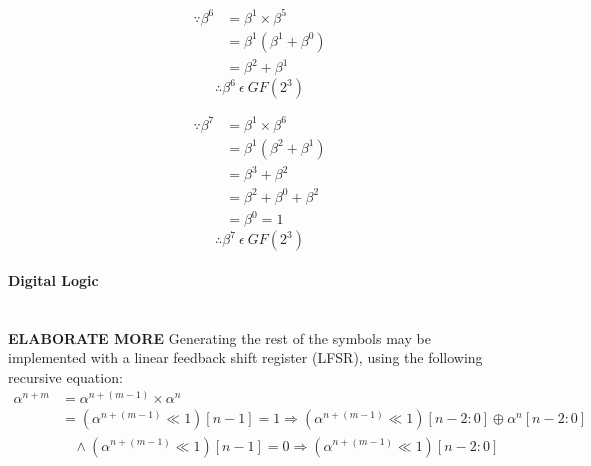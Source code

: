         \begin{minipage}[t]{0.5\textwidth}
            \begin{equation*}
                \begin{split}
                    \because \beta^{6} & = \beta^{1} \times \beta^{5} \\
                    & = \beta^{1} (\beta^{1}+\beta^{0}) \\
                    & = \beta^{2}+\beta^{1}
                \end{split}
            \end{equation*}
            \[ \therefore \beta^{6} \ \epsilon \ GF(2^{3}) \]
        \end{minipage}
        \begin{minipage}[t]{0.5\textwidth}
            \begin{equation*}
                \begin{split}
                    \because \beta^{7} & = \beta^{1} \times \beta^{6} \\
                    & = \beta^{1} (\beta^{2}+\beta^{1}) \\
                    & = \beta^{3}+\beta^{2} \\
                    & = \beta^{2}+\beta^{0}+\beta^{2} \\
                    & = \beta^{0} = 1
                \end{split}
            \end{equation*}
            \[ \therefore \beta^{7} \ \epsilon \ GF(2^{3}) \]
        \end{minipage}
        \newpage

        \paragraph{Digital Logic} \leavevmode \\ \textbf{ELABORATE MORE}
        Generating the rest of the symbols may be implemented with a linear
        feedback shift register (LFSR), using the following recursive equation:
        \begin{equation*}
            \begin{split}
                \alpha^{n+m} & =\alpha^{n+(m-1)}\times \alpha^{n} \\
                & = (\alpha^{n+(m-1)} \ll 1 )[n-1] = 1 \Longrightarrow
                (\alpha^{n+(m-1)} \ll 1 )[n-2:0] \oplus \alpha^{n}[n-2:0] \\
                & \ \ \ \ \wedge (\alpha^{n+(m-1)} \ll 1 )[n-1] = 0
                \Longrightarrow ( \alpha^{n+(m-1)} \ll 1 )[n-2:0] \\
            \end{split}
        \end{equation*}

